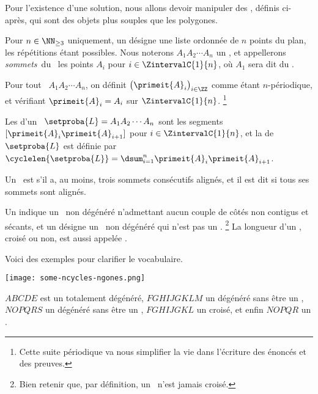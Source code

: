 Pour l'existence d'une solution, nous allons devoir manipuler des \ncycles, définis ci-après, qui sont des objets plus souples que les polygones.




\begin{defi}
    Pour $n \in \NN_{\geq3}$ uniquement, un \focus{\ncycle} désigne une liste ordonnée de $n$ points du plan, les répétitions étant possibles.
    Nous noterons $A_1 A_2 \cdots A_n$ un \ncycle,
    et appellerons
    \og \emph{sommets}\fg\ du \ncycle\ les points $A_i$ pour $i \in \ZintervalC{1}{n}$,
    où $A_1$ sera dit  du \ncycle.
\end{defi}


\begin{defi}
    Pour tout \ncycle\ $A_1 A_2 \cdots A_n$, on définit $\big( \primeit{A}_i \big)_{i \in \ZZ}$ comme étant $n$-périodique, et vérifiant $\primeit{A}_{i} = A_i$ sur $\ZintervalC{1}{n}$.%
    \footnote{
        Cette suite périodique va nous simplifier la vie dans l'écriture des énoncés et des preuves.
    }
\end{defi}


\begin{defi}
    Les  d'un \ncycle\ $\setproba{L} = A_1 A_2 \cdots A_n$ sont les segments
    $[\primeit{A}_i \primeit{A}_{i+1}]$ pour $i \in \ZintervalC{1}{n}$,
    et
    la  de $\setproba{L}$ est définie par $\cyclelen{\setproba{L}} = \dsum_{i=1}^{n} \primeit{A}_i \primeit{A}_{i+1}$.
\end{defi}


\begin{defi}
    Un \ncycle\ est  s'il a, au moins, trois sommets consécutifs alignés,
    et il est dit  si tous ses sommets sont alignés.
\end{defi}




\begin{defi}
    Un \focus{\ngone} indique un \ncycle\ non dégénéré n'admettant aucun couple de côtés non contigus et sécants,
    et
    un  désigne un \ncycle\ non dégénéré qui n'est pas un \ngone.%
    \footnote{
        Bien retenir que, par définition, un \ngone\ n'est jamais croisé.
    }
    La longueur d'un \ngone, croisé ou non, est aussi appelée .
\end{defi}


\begin{remark}
    Voici des exemples pour clarifier le vocabulaire.
    \begin{center}
        \texttt{[image: some-ncycles-ngones.png]}
    \end{center}

    $ABCDE$ est un  totalement dégénéré,
    $FGHIJGKLM$ un  dégénéré sans être un ,
    $NOPQRS$ un  dégénéré sans être un ,
    $FGHIJGKL$ un  croisé,
    et enfin
    $NOPQR$ un .
\end{remark}



